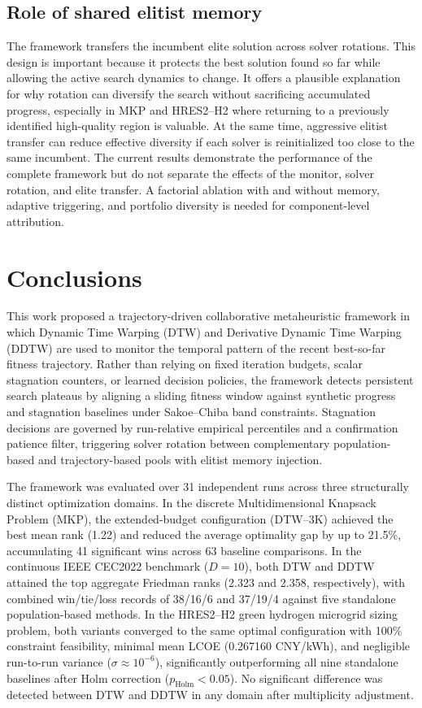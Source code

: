 \documentclass[review]{elsarticle}
\begin{document}
\subsection{Role of shared elitist memory}
\label{sec:discussion-memory}

The framework transfers the incumbent elite solution across solver rotations.
This design is important because it protects the best solution found so far
while allowing the active search dynamics to change. It offers a plausible
explanation for why rotation can diversify the search without sacrificing
accumulated progress, especially in MKP and HRES2--H2 where returning to a
previously identified high-quality region is valuable. At the same time,
aggressive elitist transfer can reduce effective diversity if each solver is
reinitialized too close to the same incumbent. The current results demonstrate
the performance of the complete framework but do not separate the effects of
the monitor, solver rotation, and elite transfer. A factorial ablation with and
without memory, adaptive triggering, and portfolio diversity is needed for
component-level attribution.


\section{Conclusions}
\label{sec:conclusions}

This work proposed a trajectory-driven collaborative metaheuristic framework in which Dynamic Time Warping (DTW) and Derivative Dynamic Time Warping (DDTW) are used to monitor the temporal pattern of the recent best-so-far fitness trajectory. Rather than relying on fixed iteration budgets, scalar stagnation counters, or learned decision policies, the framework detects persistent search plateaus by aligning a sliding fitness window against synthetic progress and stagnation baselines under Sakoe--Chiba band constraints. Stagnation decisions are governed by run-relative empirical percentiles and a confirmation patience filter, triggering solver rotation between complementary population-based and trajectory-based pools with elitist memory injection.

The framework was evaluated over 31 independent runs across three structurally distinct optimization domains. In the discrete Multidimensional Knapsack Problem (MKP), the extended-budget configuration (DTW--3K) achieved the best mean rank (1.22) and reduced the average optimality gap by up to 21.5\%, accumulating 41 significant wins across 63 baseline comparisons. In the continuous IEEE CEC2022 benchmark ($D=10$), both DTW and DDTW attained the top aggregate Friedman ranks (2.323 and 2.358, respectively), with combined win/tie/loss records of 38/16/6 and 37/19/4 against five standalone population-based methods. In the HRES2--H2 green hydrogen microgrid sizing problem, both variants converged to the same optimal configuration with 100\% constraint feasibility, minimal mean LCOE (0.267160 CNY/kWh), and negligible run-to-run variance ($\sigma \approx 10^{-6}$), significantly outperforming all nine standalone baselines after Holm correction ($p_{\mathrm{Holm}} < 0.05$). No significant difference was detected between DTW and DDTW in any domain after multiplicity adjustment.
\end{document}
